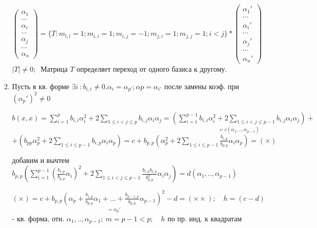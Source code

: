 \begin{enumerate}
\begin{enumerate}
    $\begin{pmatrix}
      \alpha_1 \\ \cdots \\
      \alpha_i \\ \cdots \\
      \alpha_j \\ \cdots \\
      \alpha_n 
     \end{pmatrix}  = \{T: m_{l,l} = 1; m_{i,i} = 1; m_{i,j} = -1; m_{j,i} = 1; m_{j,j} = 1; i < j\} * 
     \begin{pmatrix} 
      \alpha_1' \\ \cdots \\
      \alpha_i' \\ \cdots \\
      \alpha_j' \\ \cdots \\
      \alpha_n' 
     \end{pmatrix}
    $\quad $\left| T \right| \ne 0;\ $ Матрица $T$ определяет переход от одного базиса к другому.
 \item Пусть в кв. форме $\exists i\ : b_{i,i} \ne 0. \alpha_i = \alpha_{p'}; \alpha p = \alpha_{i'}$ после замены коэф. при $(\alpha_p')^2 \ne 0$

$b(x,x) = \sum\limits_{i=1}^p b_{i,i} \alpha_i^2 + 2\sum\limits_{1\le i<j \le p} b_{i,j} \alpha_i \alpha_j = \underset{=c(\alpha_1,..,\alpha_{p-1})}{\left( \sum\limits_{i=1}^{p-1} b_{i,i} \alpha_i^2 + 2\sum\limits_{1\le i<j \le p-1} b_{i,j} \alpha_i \alpha_j \right)} + $\\
$+ \left( b_{pp} \alpha_p^2 + 2\sum\limits_{1\le i \le p-1} b_{i,p} \alpha_i \alpha_p \right) = c + b_{p,p}\left( \alpha_p^2 + 2\sum\limits_{1\le i \le p-1} \frac{b_{i,p}}{b_{p,p}} \alpha_i \alpha_p \right) = (\times)$  

добавим и вычтем $b_{p,p} \left( \sum\limits_{i=1}^{p-1} \left( \frac{b_{i,p}}{b_{p,p}}\alpha_i \right)^2 + 2 \sum\limits_{1 \le i < j \le p-1} \frac{b_{i,p} b_{j,p}}{b_{p,p}^2}\alpha_i \alpha_j \right) = d(\alpha_1,..,\alpha_{p-1})$

$(\times) = c + b_{p,p} \underset{=\alpha_p'}{\left( \alpha_p + \frac{b_{1,p}}{b_{p,p}}\alpha_1 + \ldots + \frac{b_{p-1,p}}{b_{p,p}}\alpha_{p-1} \right)^2} - d = (\times \times);\quad h = (c-d)$ - кв. форма, отн. $\alpha_1,..,\alpha_{p-1};\ m = p-1 < p;\quad
h$ по пр. инд. к квадратам


\end{enumerate}
\end{enumerate}
